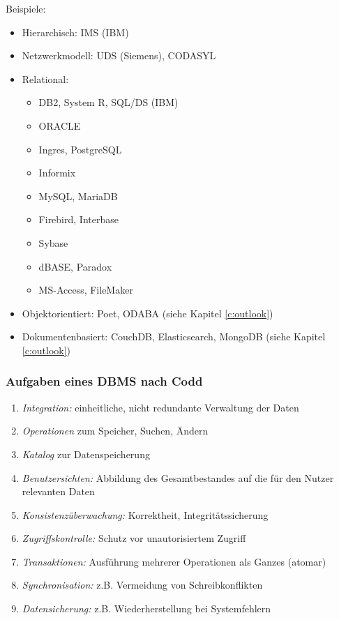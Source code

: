 \documentclass[a4paper, 11pt, accentcolor = tud3b]{tudreport}
\begin{document}
                Beispiele:
                \begin{itemize}
                	\item Hierarchisch: IMS (IBM)
                	\item Netzwerkmodell: UDS (Siemens), CODASYL
                	\item Relational:
	                	\begin{itemize}
	                		\item DB2, System R, SQL/DS (IBM)
	                		\item ORACLE
	                		\item Ingres, PostgreSQL
	                		\item Informix
	                		\item MySQL, MariaDB
	                		\item Firebird, Interbase
	                		\item Sybase
	                		\item dBASE, Paradox
	                		\item MS-Access, FileMaker
	                	\end{itemize}
	                \item Objektorientiert: Poet, ODABA (siehe Kapitel \ref{c:outlook})
	                \item Dokumentenbasiert: CouchDB, Elasticsearch, MongoDB (siehe Kapitel \ref{c:outlook})
                \end{itemize}

                \subsubsection{Aufgaben eines DBMS nach Codd} %
                    \begin{enumerate}
                    	\item \textit{Integration:} einheitliche, nicht redundante Verwaltung der Daten
                    	\item \textit{Operationen} zum Speicher, Suchen, Ändern
                    	\item \textit{Katalog} zur Datenspeicherung
                    	\item \textit{Benutzersichten:} Abbildung des Gesamtbestandes auf die für den Nutzer relevanten Daten
                    	\item \textit{Konsistenzüberwachung:} Korrektheit, Integritätssicherung
                    	\item \textit{Zugriffskontrolle:} Schutz vor unautorisiertem Zugriff
                    	\item \textit{Transaktionen:} Ausführung mehrerer Operationen als Ganzes (atomar)
                    	\item \textit{Synchronisation:} z.B. Vermeidung von Schreibkonflikten
                    	\item \textit{Datensicherung:} z.B. Wiederherstellung bei Systemfehlern
                    \end{enumerate}
\end{document}
